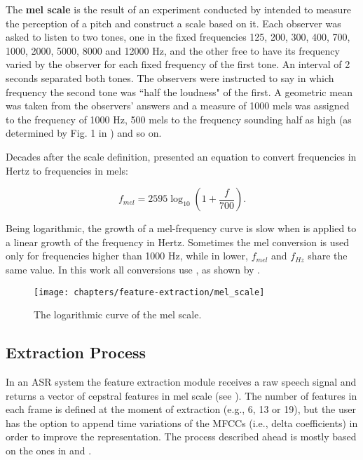 The \textbf{mel scale} is the result of an experiment conducted by  intended to measure the perception of a pitch and construct a scale based on it. Each observer was asked to listen to two tones, one in the fixed frequencies 125, 200, 300, 400, 700, 1000, 2000, 5000, 8000 and 12000 Hz, and the other free to have its frequency varied by the observer for each fixed frequency of the first tone. An interval of 2 seconds separated both tones. The observers were instructed to say in which frequency the second tone was ``half the loudness" of the first. A geometric mean was taken from the observers' answers and a measure of 1000 mels was assigned to the frequency of 1000 Hz, 500 mels to the frequency sounding half as high (as determined by Fig. 1 in ) and so on.

Decades after the scale definition,  presented an equation to convert frequencies in Hertz to frequencies in mels:

\begin{equation}
    f_{mel} = 2595 \log_{10}(1 + \frac{f}{700}).
    \label{eq:mel_conversion}
\end{equation}

\noindent Being logarithmic, the growth of a mel-frequency curve is slow when  is applied to a linear growth of the frequency in Hertz. Sometimes the mel conversion is used only for frequencies higher than 1000 Hz, while in lower, $f_{mel}$ and $f_{Hz}$ share the same value. In this work all conversions use , as shown by .

\begin{figure}[ht]
    \centering
    \texttt{[image: chapters/feature-extraction/mel\_scale]}
    \caption{The logarithmic curve of the mel scale.}
    \label{fig:mel_scale}
\end{figure}

\subsection{Extraction Process}

In an ASR system the feature extraction module receives a raw speech signal and returns a vector of cepstral features in mel scale (see ). The number of features in each frame is defined at the moment of extraction (e.g., 6, 13 or 19), but the user has the option to append time variations of the MFCCs (i.e., delta coefficients) in order to improve the representation. The process described ahead is mostly based on the ones in  and .

